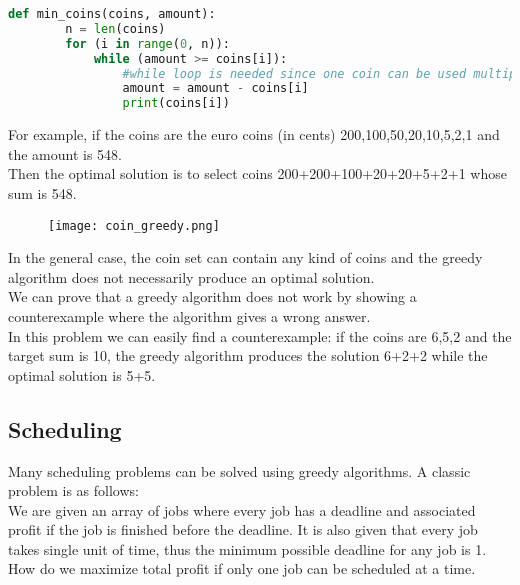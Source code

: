 \documentclass[12pt]{article}
\begin{document}
	\begin{lstlisting}[language=Python]
	def min_coins(coins, amount):
	    n = len(coins)
        for (i in range(0, n)):
            while (amount >= coins[i]):
                #while loop is needed since one coin can be used multiple times
                amount = amount - coins[i]
                print(coins[i])

    \end{lstlisting}
    \newpage
	
	For example, if the coins are the euro coins (in cents) {200,100,50,20,10,5,2,1} and the amount is 548.\\
	Then the optimal solution is to select coins 200+200+100+20+20+5+2+1 whose sum is 548.\\
	\begin{figure}[h!]
        	\centering
        	\texttt{[image: coin\_greedy.png]}
        	\label{fig:coin_greedy}
        \end{figure}
        
    In the general case, the coin set can contain any kind of coins and the greedy algorithm does not necessarily produce an optimal solution.\\
    We can prove that a greedy algorithm does not work by showing a counterexample where the algorithm gives a wrong answer.\\
    In this problem we can easily find a counterexample: if the coins are {6,5,2} and the target sum is 10, the greedy algorithm produces the solution 6+2+2 while the optimal solution is 5+5.
    \subsection{Scheduling}
    Many scheduling problems can be solved using greedy algorithms. A classic problem is as follows:\\
    We are given an array of jobs where every job has a deadline and associated profit if the job is finished before the deadline. It is also given that every job takes single unit of time, thus the minimum possible deadline for any job is 1. How do we maximize total profit if only one job can be scheduled at a time.
\end{document}
